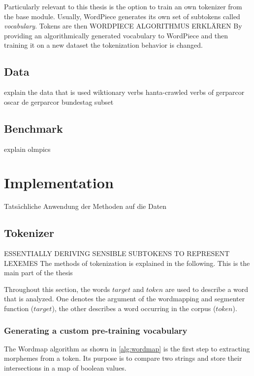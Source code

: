 Particularly relevant to this thesis is the option to train an own tokenizer from the base module.
Usually, WordPiece generates its own set of subtokens called \textit{vocabulary}.
Tokens are then \uppercase{WORDPIECE algorithmus erklären}
By providing an algorithmically generated vocabulary to WordPiece and then training it on a new dataset the tokenization behavior is changed.




\subsection{Data}
\label{subsec:data}
explain the data that is used
wiktionary verbs
hanta-crawled verbs of gerparcor
oscar de
gerparcor bundestag subset

\subsection{Benchmark}
\label{subsec:benchmark}
explain olmpics

\section{Implementation}
\label{sec:implementation}

Tatsächliche Anwendung der Methoden auf die Daten

\subsection{Tokenizer}
\label{subsec:tokenizer}
\uppercase{essentially deriving sensible subtokens to represent lexemes}
The methods of tokenization is explained in the following.
This is the main part of the thesis

Throughout this section, the words $target$ and $token$ are used to describe a word that is analyzed.
One denotes the argument of the wordmapping and segmenter function ($target$), the other describes a word occurring in the corpus ($token$).
\subsubsection{Generating a custom pre-training vocabulary}
\label{subsubsec:generating-a-custom-pre-training-vocabulary}

The Wordmap algorithm as shown in \autoref{alg:wordmap} is the first step to extracting morphemes from a token.
Its purpose is to compare two strings and store their intersections in a map of boolean values.


